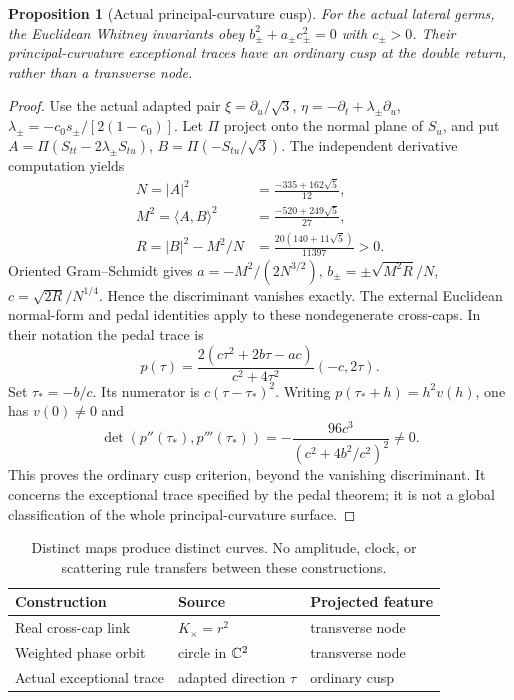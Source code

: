 \documentclass[11pt]{article}
\theoremstyle{readable}
\newtheorem{proposition}[theorem]{Proposition}
\theoremstyle{remark}\newtheorem{remark}[theorem]{Remark}
\begin{document}
\begin{proposition}[Actual principal-curvature cusp]\label{prop:cusp}
For the actual lateral germs, the Euclidean Whitney invariants obey
$b_\pm^2+a_\pm c_\pm^2=0$ with $c_\pm>0$.
Their principal-curvature exceptional traces have an ordinary cusp at the
double return, rather than a transverse node.
\end{proposition}
\begin{proof}
Use the actual adapted pair
$\xi=\partial_u/\sqrt3$, $\eta=-\partial_t+\lambda_\pm\partial_u$,
$\lambda_\pm=-c_0s_\pm/[2(1-c_0)]$. Let $\Pi$ project onto the normal
plane of $S_u$, and put
$A=\Pi(S_{tt}-2\lambda_\pm S_{tu})$, $B=\Pi(-S_{tu}/\sqrt3)$.
The independent derivative computation yields
\[
 \begin{aligned}
 N=|A|^2&=\frac{-335+162\sqrt5}{12},\\
 M^2=\langle A,B\rangle^2&=\frac{-520+249\sqrt5}{27},\\
 R=|B|^2-M^2/N&=\frac{20(140+11\sqrt5)}{11397}>0.
 \end{aligned}
\]
Oriented Gram--Schmidt gives
$a=-M^2/(2N^{3/2})$, $b_\pm=\pm\sqrt{M^2R}/N$,
$c=\sqrt{2R}/N^{1/4}$. Hence the discriminant vanishes exactly.
The external Euclidean normal-form and pedal identities
\cite[Proposition 2.1 and Eq.~(2.8)]{principal} apply to these nondegenerate
cross-caps. In their notation the pedal trace is
\[
 p(\tau)=\frac{2(c\tau^2+2b\tau-ac)}{c^2+4\tau^2}(-c,2\tau).
\]
Set $\tau_*=-b/c$. Its numerator is $c(\tau-\tau_*)^2$.
Writing $p(\tau_*+h)=h^2v(h)$, one has $v(0)\ne0$ and
\[
 \det(p''(\tau_*),p'''(\tau_*))
 =-\frac{96c^3}{(c^2+4b^2/c^2)^2}\ne0.
\]
This proves the ordinary cusp criterion, beyond the vanishing discriminant.
It concerns the exceptional trace specified by the pedal theorem; it is not
a global classification of the whole principal-curvature surface.
\end{proof}

\begin{table}[ht]\centering
\begin{tabular}{@{}lll@{}}\toprule
Construction & Source & Projected feature\\\midrule
Real cross-cap link & $K_\times=r^2$ & transverse node\\
Weighted phase orbit & circle in $\mathbb C^2$ & transverse node\\
Actual exceptional trace & adapted direction $\tau$ & ordinary cusp\\\bottomrule
\end{tabular}
\caption{Distinct maps produce distinct curves. No amplitude, clock, or
scattering rule transfers between these constructions.}
\end{table}
\end{document}
